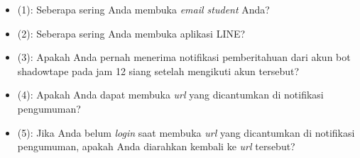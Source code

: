 \begin{itemize}
\item (1): Seberapa sering Anda membuka \textit{email student} Anda?
\item (2): Seberapa sering Anda membuka aplikasi LINE?
\item (3): Apakah Anda pernah menerima notifikasi pemberitahuan dari akun bot shadowtape pada jam 12 siang setelah mengikuti akun tersebut?
\item (4): Apakah Anda dapat membuka \textit{url} yang dicantumkan di notifikasi pengumuman?
\item (5): Jika Anda belum \textit{login} saat membuka \textit{url} yang dicantumkan di notifikasi pengumuman, apakah Anda diarahkan kembali ke \textit{url} tersebut?
\end{itemize}


